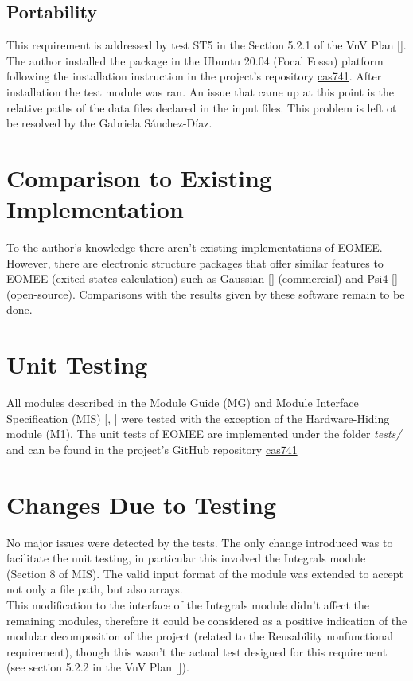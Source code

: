 \documentclass[12pt, titlepage]{article}
\begin{document}
\subsection{Portability}
This requirement is addressed by test ST5 in the Section 5.2.1 of the VnV Plan 
[\cite{VnV2020}]. The author installed the package in the Ubuntu 20.04 (Focal 
Fossa) platform 
following the installation instruction in the project's repository 
\href{https://github.com/gabrielasd/eomee/tree/cas741}{cas741}. After 
installation the test module was ran. An issue that came up at this point is 
the relative paths of the data files declared in the input files. This problem 
is left ot be resolved by the Gabriela S\'anchez-D\'iaz.
	
\section{Comparison to Existing Implementation}	

To the author's knowledge there aren't existing implementations of EOMEE. 
However, there are electronic structure packages that offer 
similar features to EOMEE (exited states calculation) such as Gaussian 
[\cite{g16}] (commercial) and Psi4 [\cite{psi4}] (open-source). Comparisons 
with the results given by these software remain to be done.

\section{Unit Testing}
All modules described in the Module Guide (MG) and Module Interface 
Specification (MIS) [\cite{MG2020}, \cite{MIS2020}] were tested with the 
exception of the Hardware-Hiding module (M1). The unit tests of EOMEE are 
implemented under the folder \textit{tests/} and 
can be found in the project's GitHub repository 
\href{https://github.com/gabrielasd/eomee/tree/cas741/test}{cas741}

\section{Changes Due to Testing}
\label{sec:changes}
No major issues were detected by the tests. The only change introduced was to 
facilitate the unit testing, in particular this involved the Integrals module 
(Section 8 of MIS). The valid input format of the module was extended to accept 
not only a file path, but also arrays. \\
This modification to the interface of the Integrals module didn't affect the 
remaining modules, therefore it could be considered as a positive indication of 
the modular decomposition of the project (related to the Reusability 
nonfunctional requirement), though this wasn't the actual test designed for 
this requirement (see section 5.2.2 in the VnV Plan [\cite{VnV2020}]). 
\end{document}

